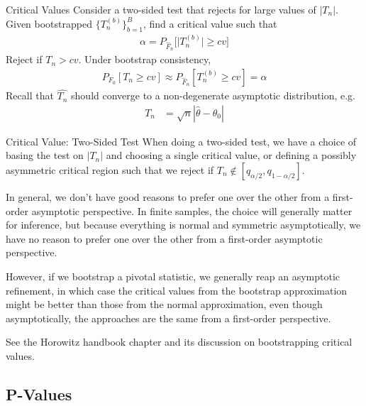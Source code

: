 \documentclass[aspectratio=169, handout]{beamer}
\begin{document}
\begin{frame}{Critical Values}
Consider a two-sided test that rejects for large values of $|T_n|$.
Given bootstrapped $\{T_n^{(b)}\}_{b=1}^B$, find a critical value such
that
\begin{align*}
  \alpha
  =
  P_{\hat{F}_n}\big[\big|T_n^{(b)}\big|\geq cv\big]
\end{align*}
Reject if $T_n>cv$.
Under bootstrap consistency,
\begin{align*}
  P_{F_0}[T_n\geq cv]
  \approx
  P_{\hat{F}_n}[T_n^{(b)}\geq cv]
  = \alpha
\end{align*}
Recall that $\hat{T_n}$ should converge to a non-degenerate asymptotic
distribution, e.g.
\begin{align*}
  T_n
  &=
  \sqrt{n}|\hat{\theta}-\theta_0|
\end{align*}
\end{frame}


{\footnotesize
\begin{frame}{Critical Value: Two-Sided Test}
When doing a two-sided test, we have a choice of basing the test on
$|T_n|$ and choosing a single critical value, or defining a possibly
asymmetric critical region such that we reject if
$T_n\not\in [q_{\alpha/2},q_{1-\alpha/2}]$.

In general, we don't have good reasons to prefer one over the other from
a first-order asymptotic perspective.
In finite samples, the choice will generally matter for inference, but
because  everything is normal and symmetric asymptotically, we have no
reason to prefer one over the other from a first-order asymptotic
perspective.

However, if we bootstrap a pivotal statistic, we generally reap an
asymptotic refinement, in which case the critical values from the
bootstrap approximation might be better than those from the normal
approximation, even though asymptotically, the approaches are the same
from a first-order perspective.

See the Horowitz handbook chapter and its discussion on bootstrapping
critical values.
\end{frame}
}


\subsection{P-Values}
\end{document}
